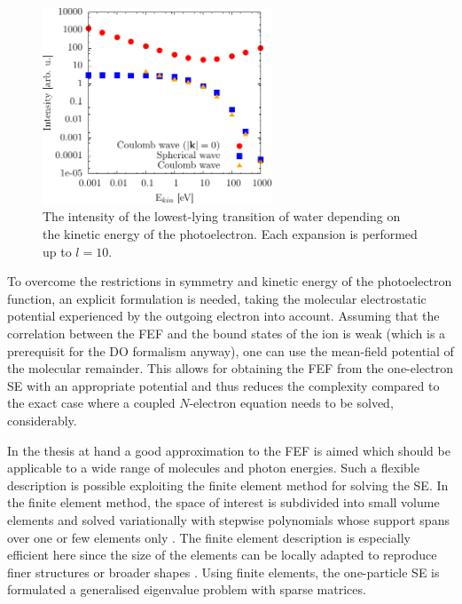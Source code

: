 \begin{figure}
   \includegraphics[width=0.61\textwidth]{Figures/water1}
   \caption{The intensity of the lowest-lying transition of water depending on the kinetic energy of the photoelectron. Each expansion is performed up to $l=10$.} 
   \label{fig:Ekin}
\end{figure}
To overcome the restrictions in symmetry and kinetic energy of the photoelectron function, an explicit formulation is needed, taking the molecular electrostatic potential experienced by the outgoing electron into account.
Assuming that the correlation between the FEF and the bound states of the ion is weak (which is a prerequisit for the DO formalism anyway), one can use the mean-field potential of the molecular remainder.
This allows for obtaining the FEF from the one-electron SE with an appropriate potential and thus reduces the complexity compared to the exact case where a coupled $N$-electron equation needs to be solved, considerably.

In the thesis at hand a good approximation to the FEF is aimed which should be applicable to a wide range of molecules and photon energies.
Such a flexible description is possible exploiting the finite element method for solving the SE.
In the finite element method, the space of interest is subdivided into small volume elements and solved variationally with stepwise polynomials whose support spans over one or few elements only \cite{femBraess,femGilbarg}.
The finite element description is especially efficient here since the size of the elements can be locally adapted to reproduce finer structures or broader shapes \cite{femBraess,femCiarlet}.
Using finite elements, the one-particle SE is formulated a generalised eigenvalue problem with sparse matrices.

